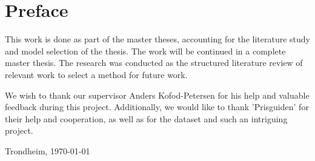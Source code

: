 \section*{Preface}



\vspace{1cm}

This work is done as part of the master theses, accounting for the literature study and model selection of the thesis.
The work will be continued in a complete master thesis.
The research was conducted as the structured literature review of relevant work to select a method for future work.

We wish to thank our supervisor Anders Kofod-Petersen for his help and valuable feedback during this project.
Additionally, we would like to thank 'Prisguiden' for their help and cooperation,
as well as for the dataset and such an intriguing project.

\vfill

\hfill \thesisAuthor

\hfill Trondheim, \today